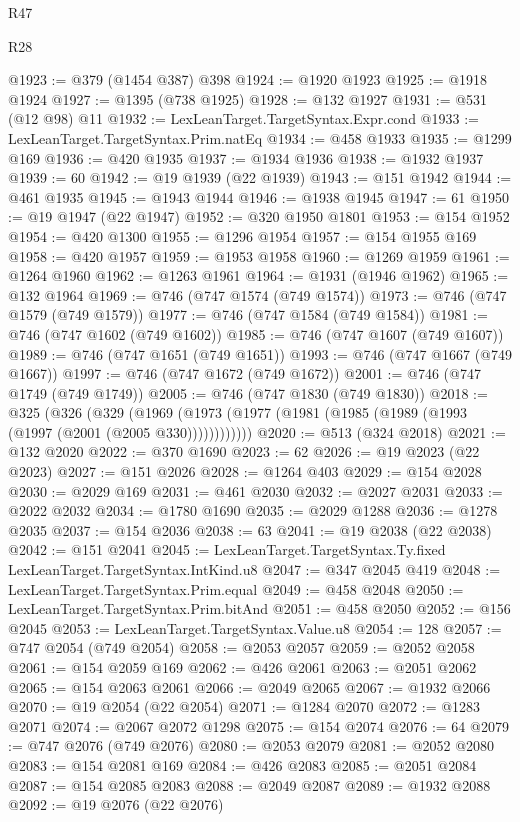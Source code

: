 \begin{lexlean}{R47}
\begin{lexlean}{R28}
\begin{coremodule}
{{{{{{{{{{{{{{{{{{{{{{{{{{{{{{{{{{{{{{{{{{{{{{{{{{{{{{{{{{{{{{{{{{{{{{{{{{{{{{{{{{{{{{{{{{{{{{{{{{{{{{{{{{{{{{{{{{{{{{{{{{{{{{{{{{{{{@1923 := @379 (@1454 @387) @398
@1924 := @1920 @1923
@1925 := @1918 @1924
@1927 := @1395 (@738 @1925)
@1928 := @132 @1927
@1931 := @531 (@12 @98) @11
@1932 := LexLeanTarget.TargetSyntax.Expr.cond
@1933 := LexLeanTarget.TargetSyntax.Prim.natEq
@1934 := @458 @1933
@1935 := @1299 @169
@1936 := @420 @1935
@1937 := @1934 @1936
@1938 := @1932 @1937
@1939 := 60
@1942 := @19 @1939 (@22 @1939)
@1943 := @151 @1942
@1944 := @461 @1935
@1945 := @1943 @1944
@1946 := @1938 @1945
@1947 := 61
@1950 := @19 @1947 (@22 @1947)
@1952 := @320 @1950 @1801
@1953 := @154 @1952
@1954 := @420 @1300
@1955 := @1296 @1954
@1957 := @154 @1955 @169
@1958 := @420 @1957
@1959 := @1953 @1958
@1960 := @1269 @1959
@1961 := @1264 @1960
@1962 := @1263 @1961
@1964 := @1931 (@1946 @1962)
@1965 := @132 @1964
@1969 := @746 (@747 @1574 (@749 @1574))
@1973 := @746 (@747 @1579 (@749 @1579))
@1977 := @746 (@747 @1584 (@749 @1584))
@1981 := @746 (@747 @1602 (@749 @1602))
@1985 := @746 (@747 @1607 (@749 @1607))
@1989 := @746 (@747 @1651 (@749 @1651))
@1993 := @746 (@747 @1667 (@749 @1667))
@1997 := @746 (@747 @1672 (@749 @1672))
@2001 := @746 (@747 @1749 (@749 @1749))
@2005 := @746 (@747 @1830 (@749 @1830))
@2018 := @325
    (@326
      (@329 (@1969 (@1973 (@1977 (@1981 (@1985 (@1989 (@1993 (@1997 (@2001 (@2005 @330))))))))))))
@2020 := @513 (@324 @2018)
@2021 := @132 @2020
@2022 := @370 @1690
@2023 := 62
@2026 := @19 @2023 (@22 @2023)
@2027 := @151 @2026
@2028 := @1264 @403
@2029 := @154 @2028
@2030 := @2029 @169
@2031 := @461 @2030
@2032 := @2027 @2031
@2033 := @2022 @2032
@2034 := @1780 @1690
@2035 := @2029 @1288
@2036 := @1278 @2035
@2037 := @154 @2036
@2038 := 63
@2041 := @19 @2038 (@22 @2038)
@2042 := @151 @2041
@2045 := LexLeanTarget.TargetSyntax.Ty.fixed LexLeanTarget.TargetSyntax.IntKind.u8
@2047 := @347 @2045 @419
@2048 := LexLeanTarget.TargetSyntax.Prim.equal
@2049 := @458 @2048
@2050 := LexLeanTarget.TargetSyntax.Prim.bitAnd
@2051 := @458 @2050
@2052 := @156 @2045
@2053 := LexLeanTarget.TargetSyntax.Value.u8
@2054 := 128
@2057 := @747 @2054 (@749 @2054)
@2058 := @2053 @2057
@2059 := @2052 @2058
@2061 := @154 @2059 @169
@2062 := @426 @2061
@2063 := @2051 @2062
@2065 := @154 @2063 @2061
@2066 := @2049 @2065
@2067 := @1932 @2066
@2070 := @19 @2054 (@22 @2054)
@2071 := @1284 @2070
@2072 := @1283 @2071
@2074 := @2067 @2072 @1298
@2075 := @154 @2074
@2076 := 64
@2079 := @747 @2076 (@749 @2076)
@2080 := @2053 @2079
@2081 := @2052 @2080
@2083 := @154 @2081 @169
@2084 := @426 @2083
@2085 := @2051 @2084
@2087 := @154 @2085 @2083
@2088 := @2049 @2087
@2089 := @1932 @2088
@2092 := @19 @2076 (@22 @2076)
}}}}}}}}}}}}}}}}}}}}}}}}}}}}}}}}}}}}}}}}}}}}}}}}}}}}}}}}}}}}}}}}}}}}}}}}}}}}}}}}}}}}}}}}}}}}}}}}}}}}}}}}}}}}}}}}}}}}}}}}}}}}}}}}}}}}}
\end{coremodule}
\end{lexlean}
\end{lexlean}
